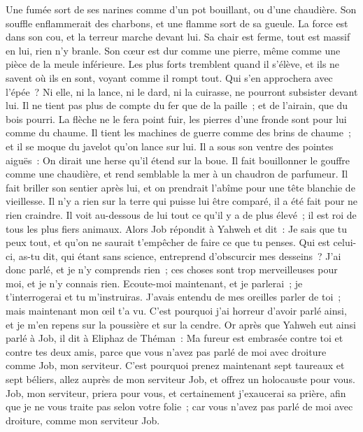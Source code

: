 \begin{multicols}{2}
Une fumée sort de ses narines comme d'un pot bouillant, ou d'une chaudière. 
Son souffle enflammerait des charbons, et une flamme sort de sa gueule. 
La force est dans son cou, et la terreur marche devant lui. 
Sa chair est ferme, tout est massif en lui, rien n'y branle. 
Son cœur est dur comme une pierre, même comme une pièce de la meule inférieure.
Les plus forts tremblent quand il s'élève, et ils ne savent où ils en sont, voyant comme il rompt tout. 
Qui s'en approchera avec l'épée~? Ni elle, ni la lance, ni le dard, ni la cuirasse, ne pourront subsister devant lui.
Il ne tient pas plus de compte du fer que de la paille~; et de l'airain, que du bois pourri. 
La flèche ne le fera point fuir, les pierres d'une fronde sont pour lui comme du chaume.
Il tient les machines de guerre comme des brins de chaume~; et il se moque du javelot qu'on lance sur lui. 
Il a sous son ventre des pointes aiguës~: On dirait une herse qu'il étend sur la boue.
Il fait bouillonner le gouffre comme une chaudière, et rend semblable la mer à un chaudron de parfumeur. 
Il fait briller son sentier après lui, et on prendrait l'abîme pour une tête blanchie de vieillesse.
Il n'y a rien sur la terre qui puisse lui être comparé, il a été fait pour ne rien craindre.
Il voit au-dessous de lui tout ce qu'il y a de plus élevé~; il est roi de tous les plus fiers animaux.
\VerseOne{}Alors Job répondit à Yahweh et dit~:
Je sais que tu peux tout, et qu'on ne saurait t'empêcher de faire ce que tu penses.
Qui est celui-ci, as-tu dit, qui étant sans science, entreprend d'obscurcir mes desseins~? J'ai donc parlé, et je n'y comprends rien~; ces choses sont trop merveilleuses pour moi, et je n'y connais rien.
Ecoute-moi maintenant, et je parlerai~; je t'interrogerai et tu m'instruiras.
J'avais entendu de mes oreilles parler de toi~; mais maintenant mon œil t'a vu.
C'est pourquoi j'ai horreur d'avoir parlé ainsi, et je m'en repens sur la poussière et sur la cendre.
Or après que Yahweh eut ainsi parlé à Job, il dit à Eliphaz de Théman~: Ma fureur est embrasée contre toi et contre tes deux amis, parce que vous n'avez pas parlé de moi avec droiture comme Job, mon serviteur.
C'est pourquoi prenez maintenant sept taureaux et sept béliers, allez auprès de mon serviteur Job, et offrez un holocauste pour vous. Job, mon serviteur, priera pour vous, et certainement j'exaucerai sa prière, afin que je ne vous traite pas selon votre folie~; car vous n'avez pas parlé de moi avec droiture, comme mon serviteur Job.

\end{multicols}
